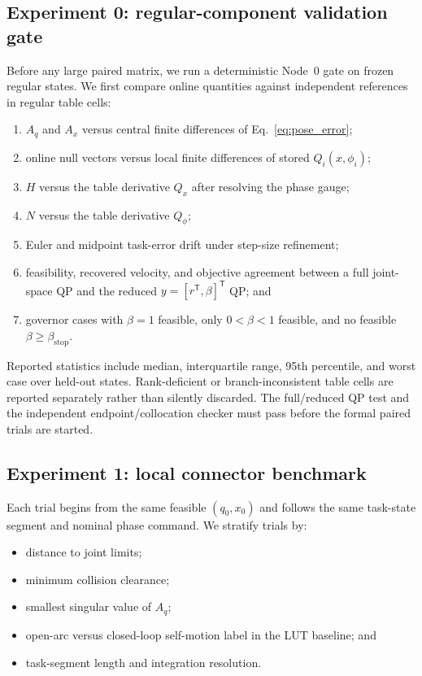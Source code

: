 \documentclass[preprint,12pt]{elsarticle}
\newcommand{\T}{^{\mathsf T}}
\begin{document}
\subsection{Experiment 0: regular-component validation gate}

Before any large paired matrix, we run a deterministic Node~0 gate on frozen regular states. We first compare online quantities against independent references in regular table cells:
\begin{enumerate}
    \item $A_q$ and $A_x$ versus central finite differences of Eq.~\eqref{eq:pose_error};
    \item online null vectors versus local finite differences of stored $Q_i(x,\phi_i)$;
    \item $H$ versus the table derivative $Q_x$ after resolving the phase gauge;
    \item $N$ versus the table derivative $Q_\phi$;
    \item Euler and midpoint task-error drift under step-size refinement;
    \item feasibility, recovered velocity, and objective agreement between a full joint-space QP and the reduced $y=[r\T,\beta]\T$ QP; and
    \item governor cases with $\beta=1$ feasible, only $0<\beta<1$ feasible, and no feasible $\beta\geq\beta_{\mathrm{stop}}$.
\end{enumerate}
Reported statistics include median, interquartile range, 95th percentile, and worst case over held-out states. Rank-deficient or branch-inconsistent table cells are reported separately rather than silently discarded. The full/reduced QP test and the independent endpoint/collocation checker must pass before the formal paired trials are started.

\subsection{Experiment 1: local connector benchmark}

Each trial begins from the same feasible $(q_0,x_0)$ and follows the same task-state segment and nominal phase command. We stratify trials by:
\begin{itemize}
    \item distance to joint limits;
    \item minimum collision clearance;
    \item smallest singular value of $A_q$;
    \item open-arc versus closed-loop self-motion label in the LUT baseline; and
    \item task-segment length and integration resolution.
\end{itemize}
\end{document}
